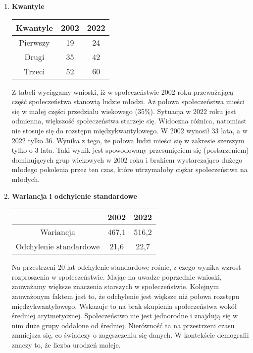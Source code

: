 \documentclass{article}
\begin{document}
\begin{enumerate}
\begin{enumerate}[label*=\arabic*.]
			\item \textbf{Kwantyle}\\
			
			\begin{table}[h]
				\centering
				\label{tab:przyklad_linie}
				\begin{tabular}{|c|c|c|}
					\hline
					Kwantyle & 2002 & 2022 \\
					\hline
					Pierwszy & 19 & 24 \\
					\hline
					Drugi & 35 & 42 \\
					\hline
					Trzeci & 52 & 60 \\
					\hline
				\end{tabular}
			\end{table}
			
			Z tabeli wyciągamy wnioski, iż w społeczeństwie 2002 roku przeważającą część społeczeństwa stanowią ludzie młodzi. Aż połowa społeczeństwa mieści się w małej części przedziału wiekowego (35\%). Sytuacja w 2022 roku jest odmienna, większość społeczeństwa starzeje się. Widoczna różnica, natomiast nie stosuje się do rozstępu międzykwantylowego. W 2002 wynosił 33 lata, a w 2022 tylko 36. Wynika z tego, że połowa ludzi mieści się w zakresie szerszym tylko o 3 lata. Taki wynik jest spowodowany przesunięciem się (postarzeniem) dominujących grup wiekowych w 2002 roku i brakiem wystarczająco dużego młodego pokolenia przez ten czas, które utrzymałoby ciężar społeczeństwa na młodych.
			
			\item \textbf{Wariancja i odchylenie standardowe}\\
			
			\begin{table}[h]
				\centering
				\begin{tabular}{|c|c|c|}
					\hline
					\cellcolor{gray!40} & 2002 & 2022 \\
					\hline
					Wariancja & 467,1 & 516,2 \\
					\hline
					Odchylenie standardowe & 21,6 & 22,7 \\
					\hline
				\end{tabular}
			\end{table}            
			
			Na przestrzeni 20 lat odchylenie standardowe rośnie, z czego wynika wzrost rozproszenia w społeczeństwie. Mając na uwadze poprzednie wnioski, zauważamy większe znaczenia starszych w społeczeństwie. Kolejnym zauważonym faktem jest to, że odchylenie jest większe niż połowa rozstępu międzykwantylowego. Wskazuje to na brak skupienia społeczeństwa wokół średniej arytmetycznej. Społeczeństwo nie jest jednorodne i znajdują się w nim duże grupy oddalone od średniej. Nierówność ta na przestrzeni czasu zmniejsza się, co świadczy o zagęszczeniu się danych. W kontekście demografii znaczy to, że liczba urodzeń maleje.
			

\end{enumerate}
\end{enumerate}
\end{document}
